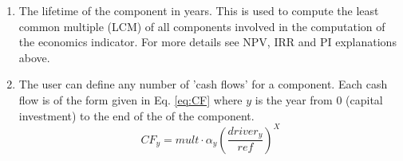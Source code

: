 \begin{enumerate}
\item[\xmlNode{Life\_time}] The lifetime of the component in years. This is used to compute the least common multiple (LCM) of all components involved in the
 computation of the economics indicator. For more details see NPV, IRR and PI explanations above.

\item[\xmlNode{CashFlow}] The user can define any number of 'cash flows' for a component. Each cash flow is of the form given in Eq. \ref{eq:CF} where $y$ is the
 year from 0 (capital investment) to the end of the  of the component.
\begin{equation}\label{eq:CF}
CF_{y}=mult\cdot\alpha_{y}\left ( \frac{driver_{y}}{ref} \right )^{X}
\end{equation}


\end{enumerate}
